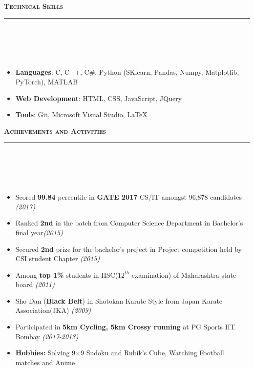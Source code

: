 \documentclass[a4paper,10pt]{article}
\newcommand{\isep}{-2 pt}
\newcommand{\lsep}{-0.5cm}
\newcommand{\resheading}[1]{{\small
        {
            \begin{minipage}
                {0.992\textwidth}\textbf{{\textsc{#1 \vphantom{p\^{E}} }}}
                \\[-0.3cm]
                \hrule
            \end{minipage}
            \\[-0.5cm]
        }
 }}
\begin{document}
\resheading{\textbf{\large Technical Skills}}\\[\lsep] 
\\[-0.3cm]
\begin{itemize}
  \item \textbf{Languages}: C, C++, C\#, Python (SKlearn, Pandas, Numpy, Matplotlib, PyTorch), MATLAB\\[-0.6cm]
  \item \textbf{Web Development}: HTML, CSS,
  JavaScript, JQuery\\[-0.6cm]
  \item \textbf{Tools}: Git, Microsoft Visual Studio, \LaTeX \\[-0.5cm]
\end{itemize}
\resheading{\textbf{\large Achievements and Activities}}\\[\lsep]
\\[-0.3cm]
\begin{itemize}\itemsep \isep
    \item \noindent Scored \textbf{99.84} percentile in \textbf{GATE 2017} CS/IT amongst 96,878 candidates \emph{\hfill  (2017)}
    \item Ranked \textbf{2nd} in the batch from Computer Science Department in Bachelor's final year\emph{\hfill  (2015)}
    \item Secured \textbf{2nd} prize for the bachelor's project in Project competition held by CSI student Chapter
    \emph{\hfill  (2015)}
    \item Among \textbf{top 1\%} students in HSC($12^{th}$ examination) of Maharashtra state board \emph{\hfill  (2011)}
    \item Sho Dan (\textbf{Black Belt}) in Shotokan Karate Style from Japan Karate Association(JKA) \emph{\hfill  (2009)}
    \item Participated in \textbf{5km Cycling, 5km Crossy running} at PG Sports IIT Bombay \emph{\hfill  (2017-2018)}
    \item \textbf{Hobbies:} Solving 9$\times$9 Sudoku and Rubik's Cube, Watching Football matches and Anime
\end{itemize}
\end{document}
